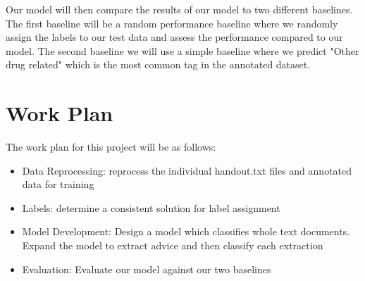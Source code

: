 \documentclass[11pt]{article}
\begin{document}
Our model will then compare the results of our model to two different baselines. The first baseline will be a random performance baseline where we randomly assign the labels to our test  data and assess the performance compared to our model. The second baseline we will use a simple baseline where we predict "Other drug related" which is the most common tag in the annotated dataset. 

\section{Work Plan}
The work plan for this project will be as follows:
\begin{itemize}
    \item Data Reprocessing: reprocess the individual handout.txt files and annotated data for training
    \item Labels: determine a consistent solution for label assignment 
    \item Model Development: Design a model which classifies whole text documents. Expand the model to extract advice and then classify each extraction
    \item Evaluation: Evaluate our model against our two baselines
\end{itemize}



\end{document}
